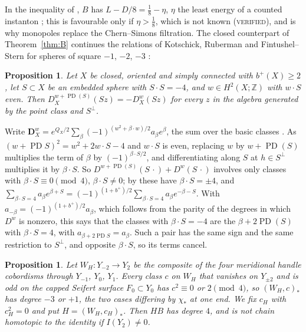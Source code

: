 \documentclass[10pt]{amsart}
\makeatletter
\numberwithin{equation}{section}
\theoremstyle{compact}
\newtheorem{proposition}[theorem]{Proposition}
\renewenvironment{proof}[1][\proofname]{\par\pushQED{\qed}\normalfont
  \topsep4\p@\relax\trivlist\item[\hskip\labelsep\itshape#1\@addpunct{.}]%
  \ignorespaces}{\popQED\endtrivlist\@endpefalse}
\newcommand{\Z}{\mathbb Z}
\newcommand{\PD}{\operatorname{PD}}
\newcommand{\ver}{\textsc{verified}}
\makeatother
\begin{document}
In the inequality of \cite[Lemma~2.7(b)]{DLME}, $B$ has $L-D/8=\frac18-\eta$,
$\eta$ the least energy of a counted instanton \cite[Prop.~3.4]{DLME}; this is
favourable only if $\eta>\frac18$, which is not known (\ver), and is why
monopoles replace the Chern--Simons filtration. The closed counterpart of
Theorem~\ref{thm:B} continues the relations of Kotschick, Ruberman and
Fintushel--Stern for spheres of square $-1$, $-2$, $-3$ \cite[Lemma~2.3(6),
Thms.~2.1, 2.4]{FS1}:

\begin{proposition}\label{prop:minus4}
Let $X$ be closed, oriented and simply connected with $b^+(X)\ge2$, let $S\subset
X$ be an embedded sphere with $S\cdot S=-4$, and $w\in H^2(X;\Z)$ with $w\cdot S$
even. Then $D^{w+\PD(S)}_X(Sz)=-D^w_X(Sz)$ for every $z$ in the algebra
generated by the point class and $S^\perp$.
\end{proposition}

\begin{proof}[Proof for simple type]
Write $\mathbf D^w_X=e^{Q_X/2}\sum_\beta(-1)^{(w^2+\beta\cdot w)/2}a_\beta e^\beta$,
the sum over the basic classes \cite[Thm.~4.1]{FS2}. As $(w+\PD
S)^2=w^2+2w\cdot S-4$ and $w\cdot S$ is even, replacing $w$ by $w+\PD(S)$
multiplies the term of $\beta$ by $(-1)^{\beta\cdot S/2}$, and differentiating
along $S$ at $h\in S^\perp$ multiplies it by $\beta\cdot S$. So
$D^{w+\PD(S)}(S\,\cdot)+D^w(S\,\cdot)$ involves only classes with $\beta\cdot
S\equiv0\pmod4$, $\beta\cdot S\ne0$; by \cite[Thm.~4.3]{FS2} these have
$\beta\cdot S=\pm4$, and $\sum_{\beta\cdot S=4}a_\beta
e^{\beta+S}=(-1)^{(1+b^+)/2}\sum_{\beta\cdot S=4}a_\beta e^{-\beta-S}$. With
$a_{-\beta}=(-1)^{(1+b^+)/2}a_\beta$, which follows from the parity of the
degrees in which $D^w$ is nonzero, this says that the classes with $\beta\cdot
S=-4$ are the $\beta+2\PD(S)$ with $\beta\cdot S=4$, with $a_{\beta+2\PD
S}=a_\beta$. Such a pair has the same sign and the same restriction to
$S^\perp$, and opposite $\beta\cdot S$, so its terms cancel.
\end{proof}

\begin{proposition}\label{prop:WH}
Let $W_H\colon Y_{-2}\to Y_2$ be the composite of the four meridional handle
cobordisms through $Y_{-1}$, $Y_0$, $Y_1$. Every class $c$ on $W_H$ that
vanishes on $Y_{\pm2}$ and is odd on the capped Seifert surface $F_0\subset Y_0$
has $c^2\equiv0$ or $2\pmod4$, so $(W_H,c)_*$ has degree $-3$ or $+1$, the two
cases differing by $\chi_*$ at one end. We fix $c_H$ with $c_H^2=0$ and put
$H=(W_H,c_H)_*$. Then $HB$ has degree $4$, and is not chain homotopic to the
identity if $I(Y_2)\ne0$.
\end{proposition}
\end{document}
